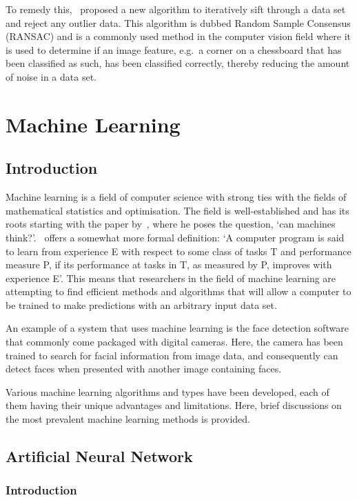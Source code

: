 To remedy this,~\cite{fischler1981random} proposed a new algorithm to iteratively sift through a data set and reject any outlier data. This algorithm is dubbed Random Sample Consensus (RANSAC) and is a commonly used method in the computer vision field where it is used to determine if an image feature, e.g.\ a corner on a chessboard that has been classified as such, has been classified correctly, thereby reducing the amount of noise in a data set. 

\section{Machine Learning}

\subsection{Introduction}

Machine learning is a field of computer science with strong ties with the fields of mathematical statistics and optimisation. The field is well-established and has its roots starting with the paper by~\cite{turing1950computing}, where he poses the question, `can machines think?'.~\cite{michalski2013machine} offers a somewhat more formal definition: `A computer program is said to learn from experience E with respect to some class of tasks T and performance measure P, if its performance at tasks in T, as measured by P, improves with experience E'. This means that researchers in the field of machine learning are attempting to find efficient methods and algorithms that will allow a computer to be trained to make predictions with an arbitrary input data set. 

An example of a system that uses machine learning is the face detection software that commonly come packaged with digital cameras. Here, the camera has been trained to search for facial information from image data, and consequently can detect faces when presented with another image containing faces.

Various machine learning algorithms and types have been developed, each of them having their unique advantages and limitations. Here, brief discussions on the most prevalent machine learning methods is provided. 

\subsection{Artificial Neural Network}

\subsubsection{Introduction}

